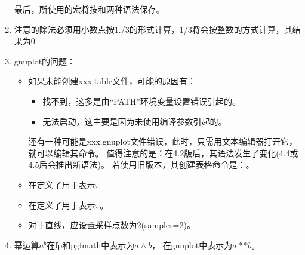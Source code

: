 \documentclass[../main.tex]{subfiles}
\begin{document}
\begin{enumerate}
最后，所使用的宏将按和两种语法保存。

\item 注意的除法必须用小数点按1./3的形式计算，1/3将会按整数的方式计算，其结果为0
\item gnuplot的问题：
  \begin{itemize}
   \item 如果未能创建xxx.table文件，可能的原因有：
     \begin{itemize}
		 \item  \TEX{}找不到，这多是由\enquote{PATH}环境变量设置错误引起的。
		 \item  \TEX{}无法启动，这主要是因为未使用编译参数引起的。
    \end{itemize}

还有一种可能是xxx.gnuplot文件错误，此时，只需用文本编辑器打开它，就可以编辑其命令。
值得注意的是：在4.2版后，其语法发生了变化(4.4或4.5后会推出新语法)。
若使用旧版本，其创建表格命令是：。


   \item 在定义了用于表示$\pi$
   \item 在定义了用于表示$\pi$。
   \item 对于直线，应设置采样点数为2(samples=2)。
  \end{itemize}

 \item 幂运算$a^b$在fp和pgfmath中表示为$a \wedge b$，
	 在gnuplot中表示为$a**b$。


\end{enumerate}
\end{document}
